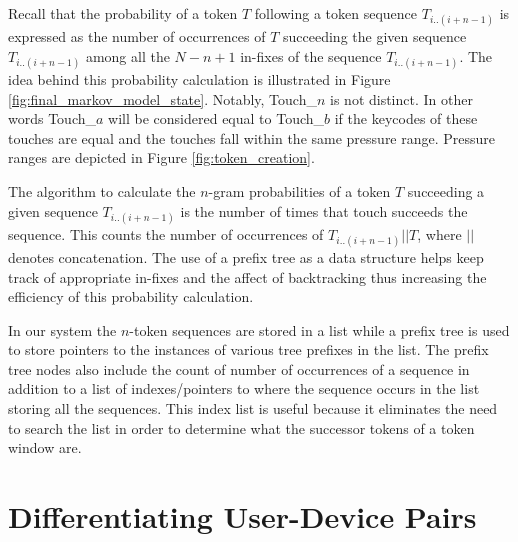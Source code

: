 \documentclass{acm_proc_article-sp}
\begin{document}
Recall that the probability of a token $T$ following  a token sequence $T_{i..(i+n-1)}$ is 
expressed as the number of occurrences of $T$ succeeding the given sequence $T_{i..(i+n-1)}$ among
all the $N-n+1$ in-fixes of the sequence $T_{i..(i+n-1)}$.
The idea behind this probability calculation is illustrated in Figure \ref{fig:final_markov_model_state}.
Notably, Touch\_$n$ is not distinct. In other words Touch\_$a$ will be considered equal to Touch\_$b$ if the keycodes of these touches are equal and the touches fall within the same pressure range. Pressure ranges are depicted in Figure \ref{fig:token_creation}.

The algorithm to calculate the $n$-gram probabilities of a token $T$ succeeding a given sequence
$T_{i..(i+n-1)}$ is the number of times that touch succeeds the sequence. This counts the  number of 
occurrences of $T_{i..(i+n-1)}||T$, where $||$ denotes concatenation.
The use of a prefix tree as a data structure helps keep track of appropriate
in-fixes and the affect of backtracking thus increasing the efficiency of this probability calculation.



In our system the $n$-token sequences are stored in a list while a prefix tree is used to store pointers to the instances of various tree prefixes in the list. 
The prefix tree nodes also include the count of number of occurrences of a sequence in addition
to a list of indexes/pointers to where the sequence occurs in the list storing all the sequences.
This index list is useful because it eliminates the need to search the list in order to determine what the successor tokens of a token window are.




\section{Differentiating User-Device Pairs}
\label{sec:differentiation}
\end{document}
